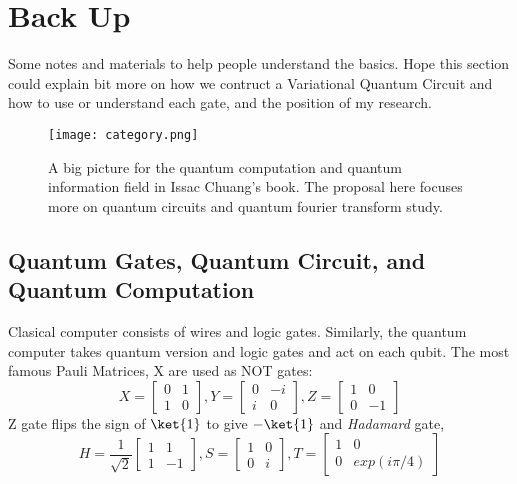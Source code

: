 
\section*{Back Up}
Some notes and materials to help people understand the basics. Hope this 
section could explain bit more on how we contruct a Variational Quantum 
Circuit and how to use or understand each gate, and the position of my 
research. 
\begin{figure}
  \texttt{[image: category.png]}
  \caption{A big picture for the quantum computation and 
  quantum information field in Issac Chuang's book. The proposal 
  here focuses more on quantum circuits and quantum fourier transform study. }
\end{figure}

\subsection*{Quantum Gates, Quantum Circuit, and Quantum Computation}
Clasical computer consists of wires and logic gates. Similarly, 
the quantum computer takes quantum version and logic gates and act on 
each qubit. The most famous Pauli Matrices, X are used as NOT gates: 
\begin{equation}
  X = \begin{bmatrix}
    0 & 1 \\ 1 & 0 
  \end{bmatrix},
  Y = \begin{bmatrix}
    0 & -i \\ i & 0 
  \end{bmatrix},
  Z = \begin{bmatrix}
    1 & 0 \\ 0 & -1 
  \end{bmatrix}
\end{equation}
Z gate flips the sign of $\ket{1}$ to give $-\ket{1}$ and 
\textit{Hadamard} gate, 
\begin{equation}
  H =  \frac{1}{\sqrt{2}}\begin{bmatrix}
    1 & 1 \\ 1 & -1
  \end{bmatrix}, S = \begin{bmatrix}
    1 & 0 \\ 0 & i
  \end{bmatrix}, T = \begin{bmatrix}
    1 & 0 \\ 0 & exp(i \pi/4)
  \end{bmatrix}
\end{equation}
